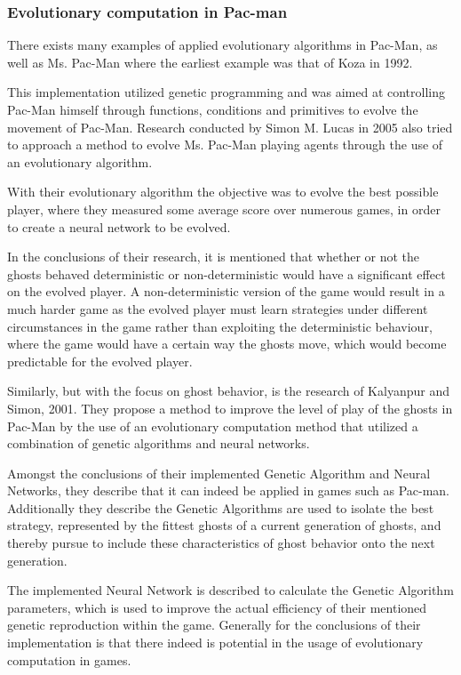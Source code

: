 \subsubsection{Evolutionary computation in Pac-man}


There exists many examples of applied evolutionary algorithms in Pac-Man, as well as Ms. Pac-Man where the earliest example was that of Koza in 1992.\cite{Koza1992}

This implementation utilized genetic programming and was aimed at controlling Pac-Man himself through functions, conditions and primitives to evolve the movement of Pac-Man. \cite[pp. 2]{Lucas2005}
Research conducted by Simon M. Lucas in 2005 also tried to approach a method to evolve Ms. Pac-Man playing agents through the use of an evolutionary algorithm. \cite{Lucas2005}

With their evolutionary algorithm the objective was to evolve the best possible player, where they measured some average score over numerous games, in order to create a neural network to be evolved. \cite[pp. 8]{Lucas2005}

In the conclusions of their research, it is mentioned that whether or not the ghosts behaved deterministic or non-deterministic would have a significant effect on the evolved player. A non-deterministic version of the game would result in a much harder game as the evolved player must learn strategies under different circumstances in the game rather than exploiting the deterministic behaviour, where the game would have a certain way the ghosts move, which would become predictable for the evolved player.\cite[pp. 8]{Lucas2005}

Similarly, but with the focus on ghost behavior, is the research of Kalyanpur and Simon, 2001. They propose a method to improve the level of play of the ghosts in Pac-Man by the use of an evolutionary computation method that utilized a combination of genetic algorithms and neural networks. \cite{Kalyanpur2001}

Amongst the conclusions of their implemented Genetic Algorithm and Neural Networks, they describe that it can indeed be applied in games such as Pac-man. Additionally they describe the Genetic Algorithms are used to isolate the best strategy, represented by the fittest ghosts of a current generation of ghosts, and thereby pursue to include these characteristics of ghost behavior onto the next generation. \cite[pp. 8]{Kalyanpur2001}

The implemented Neural Network is described to calculate the Genetic Algorithm parameters, which is used to improve the actual efficiency of their mentioned genetic reproduction within the game. Generally for the conclusions of their implementation is that there indeed is potential in the usage of evolutionary computation in games.

